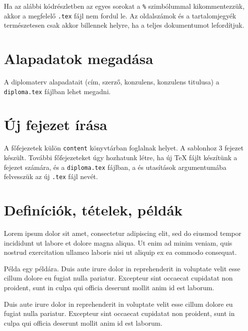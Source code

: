 Ha az alábbi kódrészletben az egyes sorokat a \verb+%+ szimbólummal kikommentezzük, akkor a megfelelő \verb+.tex+ fájl nem fordul le. Az oldalszámok és a tartalomjegyék természetesen csak akkor billennek helyre, ha a teljes dokumentumot lefordítjuk.

\newpage
\section{Alapadatok megadása}
A diplomaterv alapadatait (cím, szerző, konzulens, konzulens titulusa) a \verb+diploma.tex+ fájlban lehet megadni.

\section{Új fejezet írása}
A főfejezetek külön \verb+content+ könyvtárban foglalnak helyet. A sablonhoz 3 fejezet készült. További főfejezeteket úgy hozhatunk létre, ha új TeX fájlt készítünk a fejezet számára, és a \verb+diploma.tex+ fájlban, a \verb++ és \verb++ utasítások argumentumába felvesszük az új \verb+.tex+ fájl nevét.


\section{Definíciók, tételek, példák}

\begin{definition}
Lorem ipsum dolor sit amet, consectetur adipiscing elit, sed do eiusmod tempor incididunt ut labore et dolore magna aliqua. Ut enim ad minim veniam, quis nostrud exercitation ullamco laboris nisi ut aliquip ex ea commodo consequat. 
\end{definition}

\begin{example}
Példa egy példára. Duis aute irure dolor in reprehenderit in voluptate velit esse cillum dolore eu fugiat nulla pariatur. Excepteur sint occaecat cupidatat non proident, sunt in culpa qui officia deserunt mollit anim id est laborum.
\end{example}

\begin{theorem}
Duis aute irure dolor in reprehenderit in voluptate velit esse cillum dolore eu fugiat nulla pariatur. Excepteur sint occaecat cupidatat non proident, sunt in culpa qui officia deserunt mollit anim id est laborum.
\end{theorem}
